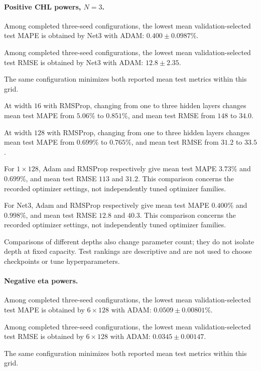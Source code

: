 \paragraph{Positive CHL powers, $N=3$.}

Among completed three-seed configurations, the lowest mean validation-selected test MAPE is obtained by Net3 with ADAM: $0.400\pm0.0987$\%.

Among completed three-seed configurations, the lowest mean validation-selected test RMSE is obtained by Net3 with ADAM: $12.8\pm2.35$.

The same configuration minimizes both reported mean test metrics within this grid.

At width $16$ with RMSProp, changing from one to three hidden layers changes mean test MAPE from $5.06\%$ to $0.851\%$, and mean test RMSE from $148$ to $34.0$.

At width $128$ with RMSProp, changing from one to three hidden layers changes mean test MAPE from $0.699\%$ to $0.765\%$, and mean test RMSE from $31.2$ to $33.5$.

For $1\times 128$, Adam and RMSProp respectively give mean test MAPE $3.73\%$ and $0.699\%$, and mean test RMSE $113$ and $31.2$. This comparison concerns the recorded optimizer settings, not independently tuned optimizer families.

For Net3, Adam and RMSProp respectively give mean test MAPE $0.400\%$ and $0.998\%$, and mean test RMSE $12.8$ and $40.3$. This comparison concerns the recorded optimizer settings, not independently tuned optimizer families.

Comparisons of different depths also change parameter count; they do not isolate depth at fixed capacity. Test rankings are descriptive and are not used to choose checkpoints or tune hyperparameters.

\paragraph{Negative eta powers.}

Among completed three-seed configurations, the lowest mean validation-selected test MAPE is obtained by $6\times 128$ with ADAM: $0.0509\pm0.00801$\%.

Among completed three-seed configurations, the lowest mean validation-selected test RMSE is obtained by $6\times 128$ with ADAM: $0.0345\pm0.00147$.

The same configuration minimizes both reported mean test metrics within this grid.

